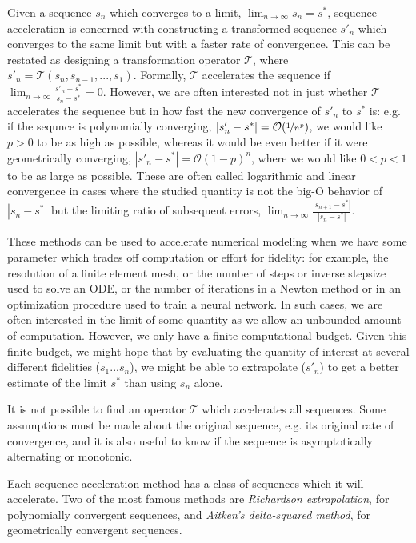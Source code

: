 \documentclass{puthesis}
\begin{document}
Given a sequence $s_n$ which converges to a limit, $\lim_{n \to \infty} s_n = s^*$,
sequence acceleration is concerned with constructing a transformed sequence $s'_n$
which converges to the same limit but with a faster rate of convergence.
This can be restated as designing a transformation operator $\mathcal{T}$, where
$s'_n = \mathcal{T}(s_n, s_{n-1}, ..., s_1)$.
Formally, $\mathcal{T}$ accelerates the sequence if
$\lim_{n \to \infty} \frac{s'_n - s^*}{s_n - s^*} = 0$.
However, we are often interested not in just whether $\mathcal{T}$ accelerates the
sequence but in how fast the new convergence of $s'_n$ to $s^*$ is: e.g.
if the sequnce is polynomially converging, $|s'_n - s^*| = \mathcal{O}(\nicefrac{1}{n^p})$,
we would like $p > 0$ to be as high as possible,
whereas it would be even better if it were geometrically converging,
$|s'_n - s^*| = \mathcal{O}(1-p)^n$, where we would like
$ 0 < p < 1$ to be as large as possible.
These are often called logarithmic and linear convergence in cases
where the studied quantity is not the big-O behavior of $|s_n - s^*|$ but the limiting
ratio of subsequent errors,
$\lim_{n \to \infty} \frac{|s_{n+1} - s^*|}{|s_n - s^*|}$.

These methods can be used to accelerate numerical modeling when we have some
parameter which trades off computation or effort for fidelity: for example, the
resolution of a finite element mesh, or the number of steps or inverse stepsize used to solve an ODE,
or the number of iterations in a Newton method or in an optimization procedure
used to train a neural network.
In such cases, we are often interested in
the limit of some quantity as we allow an unbounded amount of computation.
However, we only have a finite computational budget.
Given this finite budget, we might hope that by evaluating the quantity of interest
at several different fidelities ($s_1 ... s_n$), we might be able to extrapolate
($s'_n$) to get a better estimate of the limit $s^*$ than using $s_n$ alone.

It is not possible to find an operator $\mathcal{T}$ which accelerates all sequences.
Some assumptions must be made about the original sequence, e.g. its original rate of
convergence, and it is also useful to know if the sequence is asymptotically alternating
or monotonic.

Each sequence acceleration method has a class of sequences which it will accelerate.
Two of the most famous methods are \emph{Richardson extrapolation}, for polynomially
convergent sequences, and \emph{Aitken's delta-squared method}, for geometrically
convergent sequences.
\end{document}
